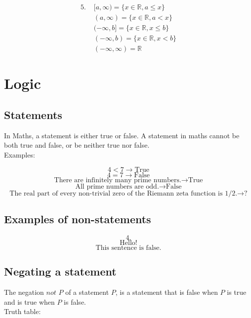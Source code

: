 \documentclass[11pt]{article}
\begin{document}
\begin{center}
\begin{align*}
\text{5. } &[a, \infty) = \{x \in \mathbb{R}, a \le x\} \\
&(a, \infty) = \{x \in \mathbb{R}, a < x\} \\
&(-\infty, b] = \{x \in \mathbb{R}, x \le b\} \\
&(-\infty, b) = \{x \in \mathbb{R}, x < b\} \\
&(-\infty, \infty) = \mathbb{R}
\end{align*}
\end{center}

\newpage


\section{Logic}
\label{sec:orgeada2ea}


\subsection{Statements}
\label{sec:orgcb916c3}
In Maths, a statement is either true or false. A statement in maths cannot be both true and false, or be neither true nor false.
\\[0pt]

Examples:

\[4 < 7 \rightarrow \text{True}\]
\[4 = 7 \rightarrow \text{False}\]
\[\text{There are infinitely many prime numbers.} \rightarrow \text{True}\]
\[\text{All prime numbers are odd.} \rightarrow \text{False}\]
\[\text{The real part of every non-trivial zero of the Riemann zeta function is 1/2.} \rightarrow \text{?}\]

\subsection{Examples of non-statements}
\label{sec:orgf608324}

\[4.\]
\[\text{Hello!}\]
\[\text{This sentence is false.}\]

\subsection{Negating a statement}
\label{sec:org247ac1b}
The negation \(not\) \(P\) of a statement \(P\), is a statement that is false when \(P\) is true and is true when \(P\) is false.
\\[0pt]

Truth table:
\end{document}
